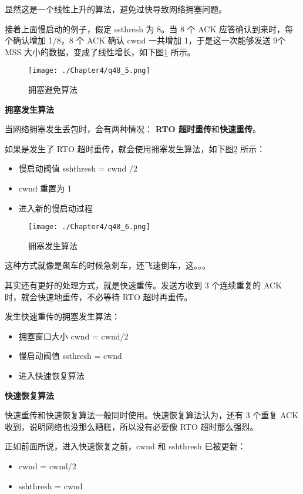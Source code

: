 \documentclass[cn,11pt,color=blue,lang=cn]{elegantbook}
\begin{document}
\begin{solution}
显然这是一个线性上升的算法，避免过快导致网络拥塞问题。

接着上面慢启动的例子，假定 ssthresh 为 8。当 8 个 ACK 应答确认到来时，每个确认增加 1/8，8 个 ACK 确认 cwnd 一共增加 1，于是这一次能够发送 9个 MSS 大小的数据，变成了线性增长，如下图\ref{fig48_5} 所示。

\begin{figure}[htbp]
\centering
\texttt{[image: ./Chapter4/q48\_5.png]}
\caption{拥塞避免算法}
\label{fig48_5}
\end{figure}

\begin{note} \textbf{拥塞发生算法} \end{note}
当网络拥塞发生丢包时，会有两种情况： \textbf{RTO 超时重传}和\textbf{快速重传}。

如果是发生了 RTO 超时重传，就会使用拥塞发生算法，如下图\ref{fig48_6} 所示：
\begin{itemize}
	\item 慢启动阀值 sshthresh = cwnd /2
	\item cwnd 重置为 1
	\item 进入新的慢启动过程
\end{itemize}

\begin{figure}[htbp]
\centering
\texttt{[image: ./Chapter4/q48\_6.png]}
\caption{拥塞发生算法}
\label{fig48_6}
\end{figure}

这种方式就像是飙车的时候急刹车，还飞速倒车，这。。。

其实还有更好的处理方式，就是快速重传。发送方收到 3 个连续重复的 ACK 时，就会快速地重传，不必等待 RTO 超时再重传。

发生快速重传的拥塞发生算法：

\begin{itemize}
	\item 拥塞窗口大小 cwnd = cwnd/2
	\item 慢启动阀值 ssthresh = cwnd
	\item 进入快速恢复算法
\end{itemize}

\begin{note} \textbf{快速恢复算法} \end{note}
快速重传和快速恢复算法一般同时使用。快速恢复算法认为，还有 3 个重复 ACK 收到，说明网络也没那么糟糕，所以没有必要像 RTO 超时那么强烈。

正如前面所说，进入快速恢复之前，cwnd 和 sshthresh 已被更新：
\begin{itemize}
	\item cwnd = cwnd/2
	\item sshthresh = cwnd
\end{itemize}


\end{solution}
\end{document}
